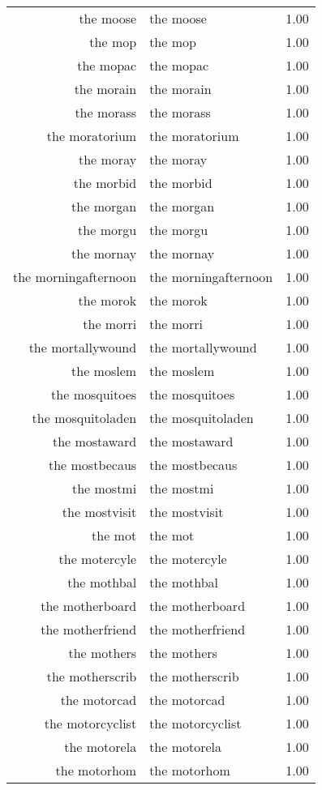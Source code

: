 \begin{table}[ht]
\begin{tabular}{rlr}
  the moose & the moose & 1.00 \\ 
  the mop & the mop & 1.00 \\ 
  the mopac & the mopac & 1.00 \\ 
  the morain & the morain & 1.00 \\ 
  the morass & the morass & 1.00 \\ 
  the moratorium & the moratorium & 1.00 \\ 
  the moray & the moray & 1.00 \\ 
  the morbid & the morbid & 1.00 \\ 
  the morgan & the morgan & 1.00 \\ 
  the morgu & the morgu & 1.00 \\ 
  the mornay & the mornay & 1.00 \\ 
  the morningafternoon & the morningafternoon & 1.00 \\ 
  the morok & the morok & 1.00 \\ 
  the morri & the morri & 1.00 \\ 
  the mortallywound & the mortallywound & 1.00 \\ 
  the moslem & the moslem & 1.00 \\ 
  the mosquitoes & the mosquitoes & 1.00 \\ 
  the mosquitoladen & the mosquitoladen & 1.00 \\ 
  the mostaward & the mostaward & 1.00 \\ 
  the mostbecaus & the mostbecaus & 1.00 \\ 
  the mostmi & the mostmi & 1.00 \\ 
  the mostvisit & the mostvisit & 1.00 \\ 
  the mot & the mot & 1.00 \\ 
  the motercyle & the motercyle & 1.00 \\ 
  the mothbal & the mothbal & 1.00 \\ 
  the motherboard & the motherboard & 1.00 \\ 
  the motherfriend & the motherfriend & 1.00 \\ 
  the mothers & the mothers & 1.00 \\ 
  the motherscrib & the motherscrib & 1.00 \\ 
  the motorcad & the motorcad & 1.00 \\ 
  the motorcyclist & the motorcyclist & 1.00 \\ 
  the motorela & the motorela & 1.00 \\ 
  the motorhom & the motorhom & 1.00 \\ 

\end{tabular}
\end{table}
